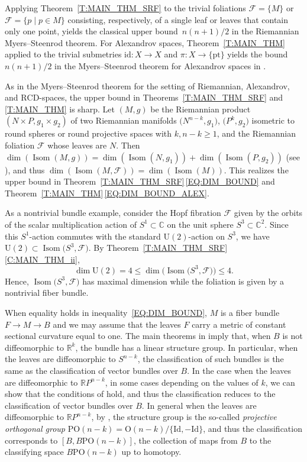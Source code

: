 \documentclass[pdftex]{sigma}
\numberwithin{equation}{section}
\theoremstyle{definition}
\DeclareMathOperator{\Iso}{Isom}
\newcommand{\R}{\mathbb{R}} %
\newcommand{\C}{\mathbb{C}} %
\newcommand{\RP}{\mathbb{R}P} %
\newcommand{\fol}{\mathcal{F}}
\begin{document}
Applying Theorem~\ref{T:MAIN_THM_SRF} to the trivial foliations $\fol = \{M\}$ or $\fol = \{{p}\mid p\in M\}$ consisting, respectively, of a single leaf or leaves that contain only one point, yields the classical upper bound~${n(n+1)/2}$ in the Riemannian Myers--Steenrod theorem. For Alexandrov spaces, Theorem~\ref{T:MAIN_THM} applied to the trivial submetries $\mathrm{id}\colon X \to X$ and $\pi\colon X \to \{\mathrm{pt}\}$ yields the bound $n(n+1)/2$ in the Myers--Steenrod theorem for Alexandrov spaces in \cite{GalazGarciaGuijarro2013}.

As in the Myers--Steenrod theorem for the setting of Riemannian, Alexandrov, and $\mathrm{RCD}$-spaces, the upper bound in Theorems~\ref{T:MAIN_THM_SRF} and \ref{T:MAIN_THM} is sharp. Let $(M,g)$ be the Riemannian product~${(N\times P, g_1\times g_2)}$ of two Riemannian manifolds $\bigl(N^{n-k},g_1\bigr)$, $\bigl(P^k,g_2\bigr)$ isometric to round spheres or round projective spaces
with $k,n-k\geq 1$,
and the Riemannian foliation $\fol$ whose leaves are $N$. Then $\dim(\Iso(M,g)) =\dim( \Iso(N,g_1))+\dim(\Iso(P,g_2))$ (see \cite[Corollary 1]{EschenburgHeintze1998}), and thus $\dim(\Iso(M,\fol)) = \dim(\Iso(M))$. This realizes the upper bound in Theorem~\ref{T:MAIN_THM_SRF}\,\eqref{EQ:DIM_BOUND} and Theorem~\ref{T:MAIN_THM}\,\eqref{EQ:DIM_BOUND_ALEX}.



As a nontrivial bundle example, consider the Hopf fibration $\fol$ given by the orbits of the scalar multiplication action of $S^1\subset \C$ on the unit sphere $S^3\subset \C^2$.
Since this $S^1$-action commutes with the standard $\mathrm{U}(2)$-action on $S^3$, we have $\mathrm{U}(2)\subset \Iso\bigl(S^3,\fol\bigr)$.
By Theorem~\ref{T:MAIN_THM_SRF}\,\ref{C:MAIN_THM_ii},
\[
\dim \mathrm{U}(2) = 4\leq \dim \bigl(\Iso\bigl(S^3,\fol\bigr)\bigr)\leq 4.
\]
Hence, $\Iso\bigl(S^3,\fol\bigr)$ has maximal dimension while the foliation is given by a nontrivial fiber bundle.


	
When equality holds in inequality~\eqref{EQ:DIM_BOUND}, $M$ is a fiber bundle $F\to M\to B$ and we may assume that the leaves $F$ carry a metric of constant sectional curvature equal to one. The main theorems in \cite{CorroGuentherGarciaKordass2020,FarrellGangKnopfOntaneda2017} imply that, when $B$ is not diffeomorphic to $\R^k$, the bundle has a linear structure group. In particular, when the leaves are diffeomorphic to $S^{n-k}$, the classification of such bundles is the same as the classification of vector bundles over $B$. In the case when the leaves are diffeomorphic to $\RP^{n-k}$, in some cases depending on the values of $k$, we can show that the conditions of \cite[Theorem 1]{BeckerGottlieb1973} hold, and thus the classification reduces to the classification of vector bundles over $B$. In general when the leaves are diffeomorphic to $\RP^{n-k}$, by \cite{CorroGuentherGarciaKordass2020}, the structure group is the so-called \emph{projective orthogonal group} $\mathrm{PO}(n-k)=\mathrm{O}(n-k)/\{\mathrm{Id},-\mathrm{Id}\}$, and thus the classification corresponds to $[B,B\mathrm{PO}(n-k)]$, the collection of maps from $B$ to the classifying space $B\mathrm{PO}(n-k)$ up to homotopy.
\end{document}
